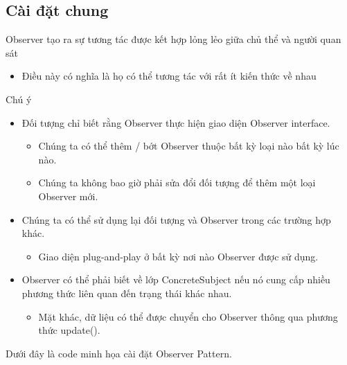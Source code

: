 \subsection{Cài đặt chung}
Observer tạo ra sự tương tác được kết hợp lỏng lẻo giữa chủ thể và người quan sát
\begin{itemize}
    \item Điều này có nghĩa là họ có thể tương tác với rất ít kiến thức về nhau
\end{itemize} 
Chú ý
\begin{itemize}
    \item Đối tượng chỉ biết rằng Observer thực hiện giao diện Observer interface.
    \begin{itemize}
        \item Chúng ta có thể thêm / bớt Observer thuộc bất kỳ loại nào bất kỳ lúc nào.
        \item Chúng ta không bao giờ phải sửa đổi đối tượng để thêm một loại Observer mới.
    \end{itemize}
    \item Chúng ta có thể sử dụng lại đối tượng và Observer trong các trường hợp khác.
    \begin{itemize}
        \item Giao diện plug-and-play ở bất kỳ nơi nào Observer được sử dụng.
    \end{itemize}
    \item Observer có thể phải biết về lớp ConcreteSubject nếu nó cung cấp nhiều phương thức liên quan đến trạng thái khác nhau.
    \begin{itemize}
        \item Mặt khác, dữ liệu có thể được chuyển cho Observer thông qua phương thức update().
    \end{itemize}
\end{itemize}

Dưới đây là code minh họa cài đặt Observer Pattern.

